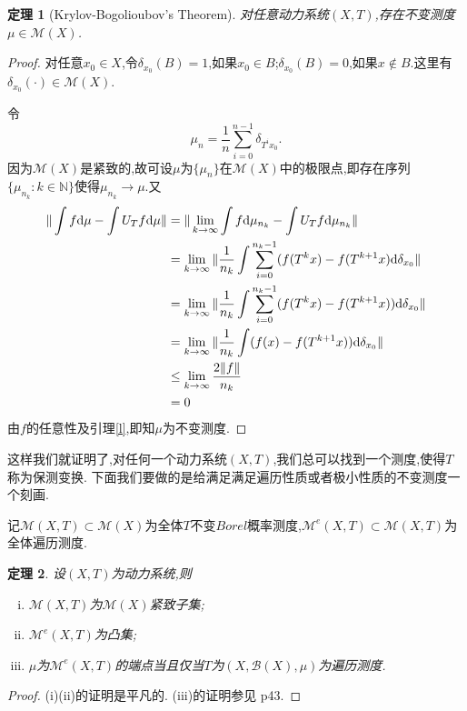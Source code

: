\documentclass[a4paper,11pt,oneside]{book}
\newtheorem{theorem}{\textbf{\hspace{0.7cm}定理}}[section]
\newcommand{\ms}[1]{\mathscr{#1}}
\begin{document}
\begin{theorem}[Krylov-Bogolioubov's Theorem]
对任意动力系统$(X,T)$,存在不变测度$\mu\in\mathcal{M}(X)$.
\end{theorem}
\begin{proof}
对任意$x_0\in X$,令$\delta_{x_0}(B)=1$,如果$x_0\in B$;$\delta_{x_0}(B)=0$,如果$x\notin B$.这里有$\delta_{x_0}(\cdot)\in\mathcal{M}(X)$.

令$$\mu_n=\frac{1}{n}\sum_{i=0}^{n-1}\delta_{T^ix_0}.$$
因为$\mathcal{M}(X)$是紧致的,故可设$\mu$为$\{\mu_n\}$在$\mathcal{M}(X)$中的极限点,即存在序列$\{\mu_{n_k}:k\in\mathbb{N}\}$使得$\mu_{n_k}\rightarrow \mu$.又
\begin{align*}
\|\int f \mathrm{d}\mu -\int U_Tf\mathrm{d}\mu\|&=\|\lim_{k\to\infty}\int f \mathrm{d}\mu_{n_k} -\int U_Tf\mathrm{d}\mu_{n_k}\|\\
&=\lim_{k\to\infty}\|\frac{1}{n_k}\int\sum_{i=0}^{n_k-1}(f(T^kx)-f(T^{k+1}x)\mathrm{d}\delta_{x_0}\|\\
&=\lim_{k\to\infty}\|\frac{1}{n_k}\int\sum_{i=0}^{n_k-1}(f(T^kx)-f(T^{k+1}x))\mathrm{d}\delta_{x_0} \|\\
&=\lim_{k\to\infty}\|\frac{1}{n_k}\int(f(x)-f(T^{k+1}x))\mathrm{d}\delta_{x_0} \|\\
&\leq \lim_{k\to\infty}{2\|f\|\over n_k}\\
&=0
\end{align*}
由$f$的任意性及引理\ref{l},即知$\mu$为不变测度.
\end{proof}

这样我们就证明了,对任何一个动力系统$(X,T)$,我们总可以找到一个测度,使得$T$称为保测变换.
下面我们要做的是给满足满足遍历性质或者极小性质的不变测度一个刻画.

记$\mathcal{M}(X,T)\subset\mathcal{M}(X)$为全体$T$不变$Borel$概率测度,$\mathcal{M}^e(X,T)\subset\mathcal{M}(X,T)$为全体遍历测度.

\begin{theorem}
设$(X,T)$为动力系统,则
\begin{enumerate}[(i)]
\item $\mathcal{M}(X,T)$为$\mathcal{M}(X)$紧致子集;
\item $\mathcal{M}^e(X,T)$为凸集;
\item $\mu$为$\mathcal{M}^e(X,T)$的端点当且仅当$T$为$(X,\ms B(X),\mu)$为遍历测度.
\end{enumerate}
\end{theorem}
\begin{proof}
(i)(ii)的证明是平凡的.
(iii)的证明参见\cite{hy} p43.
\end{proof}
\end{document}
